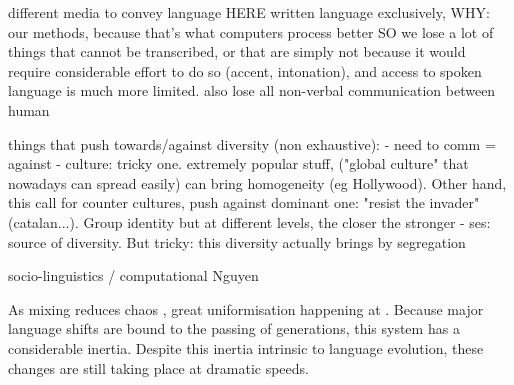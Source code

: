 \documentclass[../thesis.tex]{subfiles}
\begin{document}
different media to convey language
HERE written language exclusively, WHY: our methods, because that's what computers process better
SO we lose a lot of things that cannot be transcribed, or that are simply not because it would require considerable effort to do so  (accent, intonation), and access to spoken language is much more limited. also lose all non-verbal communication between human

things that push towards/against diversity (non exhaustive):
- need to comm = against
- culture: tricky one. extremely popular stuff, ("global culture" that nowadays can spread easily) can bring homogeneity (eg Hollywood). Other hand, this call for counter cultures, push against dominant one: "resist the invader" (catalan...). Group identity but at different levels, the closer the stronger
- ses: source of diversity. But tricky: this diversity actually brings by segregation

socio-linguistics / computational Nguyen

As mixing reduces chaos , great uniformisation happening at . Because major language shifts are bound to the passing of generations, this system has a considerable inertia. Despite this inertia intrinsic to language evolution, these changes are still taking place at dramatic speeds.
\end{document}
